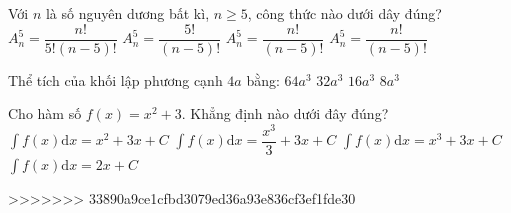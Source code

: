 \begin{ex}%
Với $n$ là số nguyên dương bất kì, $n \geq 5$, công thức nào dưới dây đúng?
\choice
{$A_n^5=\dfrac{n !}{5!(n-5) !}$}
{$A_n^5=\dfrac{5!}{(n-5) !}$}
{\True $A_n^5=\dfrac{n !}{(n-5) !}$}
{$A_n^5=\dfrac{n !}{(n-5) !}$}

\end{ex}
\begin{ex}%
Thể tích của khối lập phương cạnh $4 a$ bằng:
\choice
{\True $64 a^3$}
{$32 a^3$}
{$16 a^3$}
{$8 a^3$}
\end{ex}
\begin{ex}%
Cho hàm số $f(x)=x^2+3$. Khẳng định nào dưới đây đúng?
\choice
{$\displaystyle\int f(x) \mathrm{d} x=x^2+3 x+C$}
{\True $\displaystyle\int f(x) \mathrm{d} x=\dfrac{x^3}{3}+3 x+C$}
{$\displaystyle\int f(x) \mathrm{d} x=x^3+3 x+C$}
{$\displaystyle\int f(x) \mathrm{d} x=2 x+C$}
\end{ex}

>>>>>>> 33890a9ce1cfbd3079ed36a93e836cf3ef1fde30
